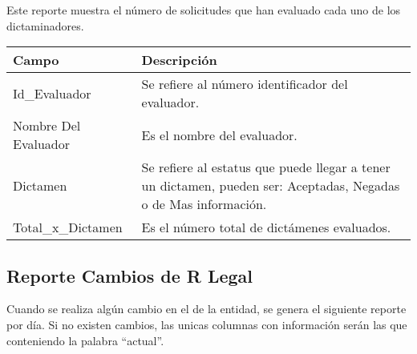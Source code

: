 Este reporte muestra el número de solicitudes que han evaluado cada uno de los dictaminadores.\\

\begin{tabular}{ m{} m{}  }%
	\rowcolor{gray1} {\bf Campo} &  {\bf Descripción} \\ \hline \hline

	Id\_Evaluador & Se refiere al número identificador del evaluador.\\
	\rowcolor{gray1}Nombre Del Evaluador & Es el nombre del evaluador.\\
	Dictamen & Se refiere al estatus que puede llegar a tener un dictamen, pueden ser: Aceptadas, Negadas o de Mas información.\\
	\rowcolor{gray1}Total\_x\_Dictamen & Es el número total de dictámenes evaluados.\\
\end{tabular}

\subsection{Reporte Cambios de R Legal}
\label{appendix:Reportes:PeopleSoft:ReporteRLegal}

Cuando se realiza algún cambio en el  de la entidad, se genera el siguiente reporte por día. Si no existen cambios, las unicas columnas con información serán las que conteniendo la palabra ``actual''.\\


